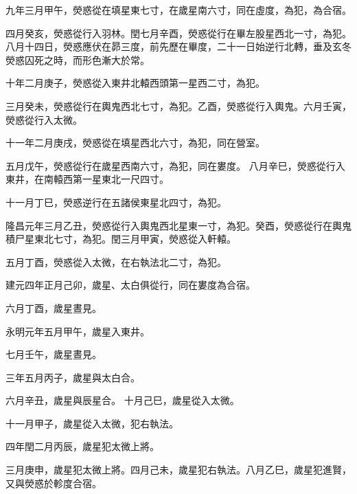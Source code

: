 \begin{pinyinscope}
 九年三月甲午，熒惑從在填星東七寸，在歲星南六寸，同在虛度，為犯，為合宿。



 四月癸亥，熒惑從行入羽林。閏七月辛酉，熒惑從行在畢左股星西北一寸，為犯。八月十四日，熒惑應伏在昴三度，前先歷在畢度，二十一日始逆行北轉，垂及玄冬熒惑囚死之時，而形色漸大於常。



 十年二月庚子，熒惑從入東井北轅西頭第一星西二寸，為犯。



 三月癸未，熒惑從行在輿鬼西北七寸，為犯。乙酉，熒惑從行入輿鬼。六月壬寅，熒惑從行入太微。



 十一年二月庚戌，熒惑從在填星西北六寸，為犯，同在營室。



 五月戊午，熒惑從行在歲星西南六寸，為犯，同在婁度。
 八月辛巳，熒惑從行入東井，在南轅西第一星東北一尺四寸。



 十一月丁巳，熒惑逆行在五諸侯東星北四寸，為犯。



 隆昌元年三月乙丑，熒惑從行入輿鬼西北星東一寸，為犯。癸酉，熒惑從行在輿鬼積尸星東北七寸，為犯。閏三月甲寅，熒惑從入軒轅。



 五月丁酉，熒惑從入太微，在右執法北二寸，為犯。



 建元四年正月己卯，歲星、太白俱從行，同在婁度為合宿。



 六月丁酉，歲星晝見。



 永明元年五月甲午，歲星入東井。



 七月壬午，歲星晝見。



 三年五月丙子，歲星與太白合。



 六月辛丑，歲星與辰星合。
 十月己巳，歲星從入太微。



 十一月甲子，歲星從入太微，犯右執法。



 四年閏二月丙辰，歲星犯太微上將。



 三月庚申，歲星犯太微上將。四月己未，歲星犯右執法。八月乙巳，歲星犯進賢，又與熒惑於軫度合宿。




\end{pinyinscope}
